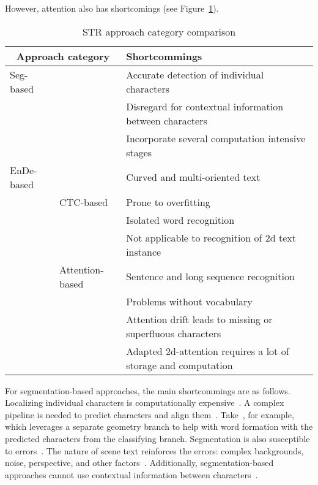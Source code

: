 However, attention also has shortcomings (see Figure~\ref{tb:STR-comparison}).
\begin{table}[h]
    \centering\scriptsize
    \begin{tabular}{p{}p{}p{}}
        \multicolumn{2}{c}{\textbf{Approach category}} & \textbf{Shortcommings} \\
        \toprule
        Seg-based & & Accurate detection of individual
                        characters~\citep{chen_text_2021,cheng_aon_2018} \\
        & & Disregard for contextual information between characters~\citep{chen_text_2021} \\
        & & Incorporate several computation intensive stages~\citep{liu_abcnet_2020} \\
        \midrule
        \ac{EnDe}-based & & Curved and multi-oriented text~\citep{cheng_aon_2018, long_scene_2021} \\
        & CTC-based & Prone to overfitting~\citep{chen_text_2021} \\
        & & Isolated word recognition~\citep{cong_comparative_2019} \\
        & & Not applicable to recognition of 2d text instance~\citep{cheng_focusing_2017,
            xie_aggregation_2019,chen_text_2021} \\
        & Attention-based & Sentence and long sequence
            recognition~\citep{cong_comparative_2019,chen_text_2021} \\
        & & Problems without vocabulary~\citep{wan_vocabulary_2020} \\
        & & Attention drift leads to missing or superfluous
            characters~\citep{liao_scene_2018,xie_aggregation_2019,chen_text_2021}\\
        & & Adapted 2d-attention requires a lot of storage and
            computation~\citep{xie_aggregation_2019,chen_text_2021} \\
        \bottomrule
    \end{tabular}
    \caption{STR approach category comparison\label{tb:STR-comparison}}
\end{table}
For segmentation-based approaches, the main shortcommings are as follows.
Localizing individual characters is computationally expensive~\citep{zhan_esir_2019}.
A complex pipeline is needed to predict characters and align them~\citep{liu_abcnet_2020}.
Take~\cite{wan_textscanner_2020}, for example, which leverages a separate geometry branch
to help with word formation with the predicted characters from the classifying branch.
Segmentation is also susceptible to errors~\citep{zhan_esir_2019,cheng_aon_2018,chen_text_2021}.
The nature of scene text reinforces the errors: complex backgrounds, noise, perspective,
and other factors~\citep{hu_gtc_2020,chen_text_2021,baek_what_2019}.
Additionally, segmentation-based approaches cannot use contextual information between
characters~\citep{chen_text_2021}.


